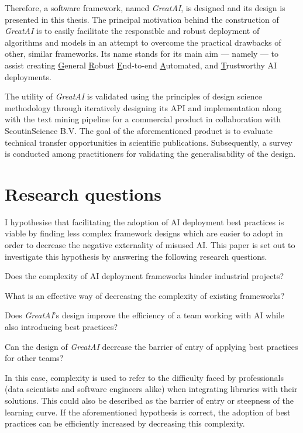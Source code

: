 Therefore, a software framework, named \textit{GreatAI}, is designed and its design is presented in this thesis. The principal motivation behind the construction of \textit{GreatAI} is to easily facilitate the responsible and robust deployment of algorithms and models in an attempt to overcome the practical drawbacks of other, similar frameworks. Its name stands for its main aim --- namely --- to assist creating \underline{G}eneral \underline{R}obust \underline{E}nd-to-end \underline{A}utomated, and \underline{T}rustworthy AI deployments.

The utility of \textit{GreatAI} is validated using the principles of design science methodology \cite{wieringa2014design} through iteratively designing its API and implementation along with the text mining pipeline for a commercial product in collaboration with ScoutinScience B.V. The goal of the aforementioned product is to evaluate technical transfer opportunities in scientific publications. Subsequently, a survey is conducted among practitioners for validating the generalisability of the design.

\section{Research questions}

I hypothesise that facilitating the adoption of AI deployment best practices is viable by finding less complex framework designs which are easier to adopt in order to decrease the negative externality of misused AI. This paper is set out to investigate this hypothesis by answering the following research questions. 

\begin{rqlist}
  \item Does the complexity of AI deployment frameworks hinder industrial projects?
  \item What is an effective way of decreasing the complexity of existing frameworks?
  \item Does \textit{GreatAI}'s design improve the efficiency of a team working with AI while also introducing best practices?
  \item Can the design of \textit{GreatAI} decrease the barrier of entry of applying best practices for other teams?
\end{rqlist}

In this case, complexity is used to refer to the difficulty faced by professionals (data scientists and software engineers alike) when integrating libraries with their solutions. This could also be described as the barrier of entry or steepness of the learning curve. If the aforementioned hypothesis is correct, the adoption of best practices can be efficiently increased by decreasing this complexity.

